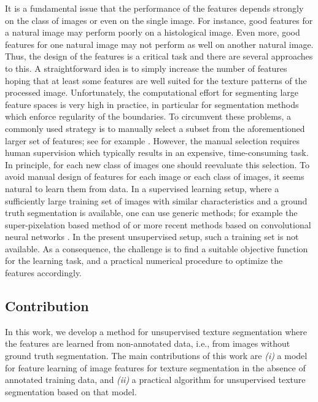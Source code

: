 \documentclass[journal]{IEEEtran}
\newcommand{\Idea}[1]{{\ifdefined\DRAFT{\color{blue}#1}\fi}}
\begin{document}
 It is a fundamental issue that 
  the performance of the features 
  depends strongly on the class of images or even on the single image.
For instance, good features for a natural image may
   perform poorly on a histological image.
  Even more, good features for one natural image may 
  not perform as well on another natural image.
  Thus, the design of the features is a critical task
and there are several approaches to this.
A straightforward idea is to simply 
increase the number of features hoping that
at least some features are well suited for the texture patterns of the processed image.
Unfortunately, the computational effort for segmenting large feature spaces is very high in practice, in particular for segmentation methods which enforce regularity of the boundaries.
To circumvent these problems, a commonly used strategy is
to manually select a subset from the aforementioned larger set of features; 
see for example \cite{kato2006markov, yuan2015factorization}.
\Idea{MEHR CITES}
However, the manual selection requires human supervision 
which typically results in an expensive, time-consuming task.
In principle, for each new class of images one should reevaluate this selection.
To avoid manual design of features for each image or each class of images,
it seems natural to learn them from data.
In a supervised learning setup,
where a sufficiently large training set of images with similar characteristics and a ground truth segmentation is available,
one can use generic methods;
for example the super-pixelation based method of \cite{ren2003learning}
or more recent methods based on convolutional neural networks
\cite{long2015fully}.
In the present unsupervised setup, 
such a training set is not available. 
As a consequence, the challenge is to find a
suitable objective function for the learning task,
and a practical numerical procedure to optimize the features accordingly.








\subsection{Contribution}

In this work, we develop a method
for unsupervised texture segmentation 
where the features are learned from non-annotated data,
i.e., from images without ground truth segmentation.
The main contributions of this work are
\emph{(i)} a model for feature learning of image features 
for texture segmentation in the absence of annotated training data,
and \emph{(ii)} 
a practical algorithm for unsupervised texture segmentation based on that model.
\end{document}
